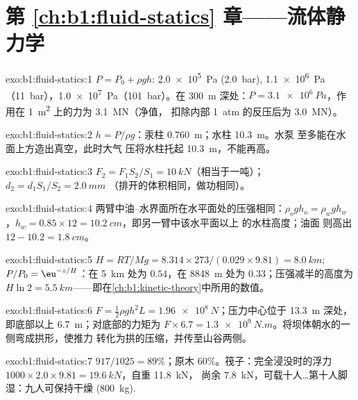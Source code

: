 \section*{第 \ref{ch:b1:fluid-statics} 章——流体静力学}

\begin{solution}{exo:b1:fluid-statics:1}
$P = P_0 + \rho gh$: \qty{2.0e5}{Pa} (\qty{2.0}{bar}), \qty{1.1e6}{Pa}
（\qty{11}{bar}），\qty{1.0e7}{Pa}（\qty{101}{bar}）。在 \qty{300}{m} 深处：$P =
\qty{3.1e6}{Pa}$，作用在 \qty{1}{m^2} 上的力为 \qty{3.1}{MN}（净值，
扣除内部 \qty{1}{atm} 的反压后为 \qty{3.0}{MN}）。
\end{solution}

\begin{solution}{exo:b1:fluid-statics:2}
$h = P/\rho g$：汞柱 \qty{0.760}{m}；水柱 \qty{10.3}{m}。水泵
至多能在水面上方造出真空，此时大气
压将水柱托起 \qty{10.3}{m}，不能再高。
\end{solution}

\begin{solution}{exo:b1:fluid-statics:3}
$F_2 = F_1S_2/S_1 = \qty{10}{kN}$（相当于一吨）；$d_2 = d_1S_1/S_2 = \qty{2.0}{mm}$
（排开的体积相同，做功相同）。
\end{solution}

\begin{solution}{exo:b1:fluid-statics:4}
两臂中油–水界面所在水平面处的压强相同：$\rho_og
h_o = \rho_wgh_w$，$h_w = 0.85 \times 12 = \qty{10.2}{cm}$，即另一臂中该水平面以上
的水柱高度；油面
则高出 $12 - 10.2 = \qty{1.8}{cm}$。
\end{solution}

\begin{solution}{exo:b1:fluid-statics:5}
$H = RT/Mg = 8.314 \times 273/(0.029 \times 9.81) = \qty{8.0}{km}$; $P/P_0 =
\eu^{-z/H}$：在 \qty{5}{km} 处为 $0.54$，在 \qty{8848}{m} 处为 $0.33$；压强减半的高度为 $H\ln2 =
\qty{5.5}{km}$——即在\cref{ch:b1:kinetic-theory}中所用的数值。
\end{solution}

\begin{solution}{exo:b1:fluid-statics:6}
$F = \tfrac12\rho gh^2L = \qty{1.96e8}{N}$；压力中心位于 \qty{13.3}{m}
深处，即底部以上 \qty{6.7}{m}；对底部的力矩为 $F \times
6.7 = \qty{1.3e9}{N.m}$。将坝体朝水的一侧弯成拱形，使推力
转化为拱的压缩，并传至山谷两侧。
\end{solution}

\begin{solution}{exo:b1:fluid-statics:7}
$917/1025 = 89\%$；原木 $60\%$。筏子：完全浸没时的浮力 $1000 \times
2.0 \times 9.81 = \qty{19.6}{kN}$，自重 \qty{11.8}{kN}，
尚余 \qty{7.8}{kN}，可载十人\dots{}第十人脚湿：九人可保持干燥
(\qty{800}{kg}).
\end{solution}

